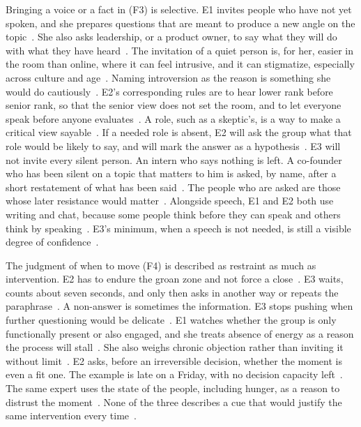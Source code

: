 Bringing a voice or a fact in (F3) is selective.
E1 invites people who have not yet spoken, and she prepares questions that are meant to
produce a new angle on the topic~.
She also asks leadership, or a product owner, to say what they will do with what they have
heard~.
The invitation of a quiet person is, for her, easier in the room than online, where it can
feel intrusive, and it can stigmatize, especially across culture and age~.
Naming introversion as the reason is something she would do cautiously~.
E2's corresponding rules are to hear lower rank before senior rank, so that the senior view
does not set the room, and to let everyone speak before anyone
evaluates~.
A role, such as a skeptic's, is a way to make a critical view sayable~.
If a needed role is absent, E2 will ask the group what that role would be likely to say, and
will mark the answer as a hypothesis~.
E3 will not invite every silent person.
An intern who says nothing is left.
A co-founder who has been silent on a topic that matters to him is asked, by name, after a
short restatement of what has been said~.
The people who are asked are those whose later resistance would matter~.
Alongside speech, E1 and E2 both use writing and chat, because some people think before they
can speak and others think by speaking~.
E3's minimum, when a speech is not needed, is still a visible degree of confidence~.

The judgment of when to move (F4) is described as restraint as much as intervention.
E2 has to endure the groan zone and not force a close~.
E3 waits, counts about seven seconds, and only then asks in another way or repeats the
paraphrase~.
A non-answer is sometimes the information.
E3 stops pushing when further questioning would be delicate~.
E1 watches whether the group is only functionally present or also engaged, and she treats
absence of energy as a reason the process will stall~.
She also weighs chronic objection rather than inviting it without limit~.
E2 asks, before an irreversible decision, whether the moment is even a fit one.
The example is late on a Friday, with no decision capacity left~.
The same expert uses the state of the people, including hunger, as a reason to distrust the
moment~.
None of the three describes a cue that would justify the same intervention every
time~.

